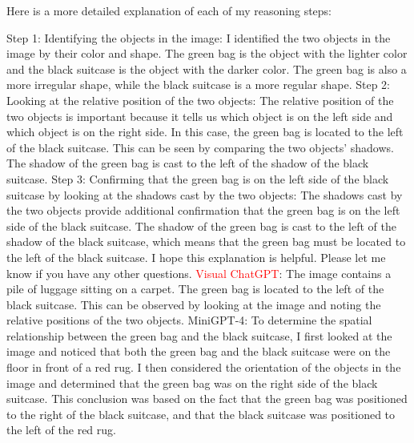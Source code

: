 \begin{enumerate}
        Here is a more detailed explanation of each of my reasoning steps:
        
        Step 1: Identifying the objects in the image: I identified the two objects in the image by their color and shape. The green bag is the object with the lighter color and the black suitcase is the object with the darker color. The green bag is also a more irregular shape, while the black suitcase is a more regular shape.
        Step 2: Looking at the relative position of the two objects: The relative position of the two objects is important because it tells us which object is on the left side and which object is on the right side. In this case, the green bag is located to the left of the black suitcase. This can be seen by comparing the two objects' shadows. The shadow of the green bag is cast to the left of the shadow of the black suitcase.
        Step 3: Confirming that the green bag is on the left side of the black suitcase by looking at the shadows cast by the two objects: The shadows cast by the two objects provide additional confirmation that the green bag is on the left side of the black suitcase. The shadow of the green bag is cast to the left of the shadow of the black suitcase, which means that the green bag must be located to the left of the black suitcase.
        I hope this explanation is helpful. Please let me know if you have any other questions.
        \subitem \textcolor{red}{Visual ChatGPT}: The image contains a pile of luggage sitting on a carpet. The green bag is located to the left of the black suitcase. This can be observed by looking at the image and noting the relative positions of the two objects.
        \subitem MiniGPT-4: To determine the spatial relationship between the green bag and the black suitcase, I first looked at the image and noticed that both the green bag and the black suitcase were on the floor in front of a red rug. I then considered the orientation of the objects in the image and determined that the green bag was on the right side of the black suitcase. This conclusion was based on the fact that the green bag was positioned to the right of the black suitcase, and that the black suitcase was positioned to the left of the red rug.
    \end{enumerate}
